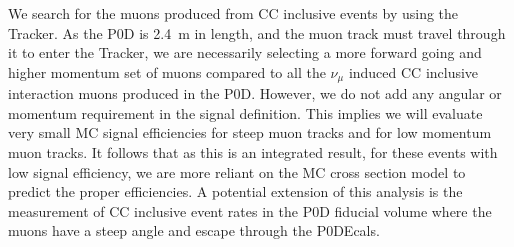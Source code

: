 We search for the muons produced from CC inclusive events by using the Tracker. As the P0D is 2.4~m in length, and the muon track must travel through it to enter the Tracker, we are necessarily selecting a more forward going and higher momentum set of muons compared to all the $\nu_\mu$ induced CC inclusive interaction muons produced in the P0D. However, we do not add any angular or momentum requirement in the signal definition. This implies we will evaluate very small MC signal efficiencies for steep muon tracks and for low momentum muon tracks. It follows that as this is an integrated result, for these events with low signal efficiency, we are more reliant on the MC cross section model to predict the proper efficiencies. A potential extension of this analysis is the measurement of CC inclusive event rates in the P0D fiducial volume where the muons have a steep angle and escape through the P0DEcals. 


